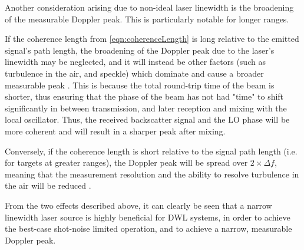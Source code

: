     Another consideration arising due to non-ideal laser linewidth is the broadening of the measurable Doppler peak. This is particularly notable for longer ranges.

    If the coherence length from \autoref{eqn:coherenceLength} is long relative to the emitted signal's path length, the broadening of the Doppler peak due to the laser's linewidth may be neglected, and it will instead be other factors (such as turbulence in the air, and speckle) which dominate and cause a broader measurable peak \cite{bennett_doppler_2003}. This is because the total round-trip time of the beam is shorter, thus ensuring that the phase of the beam has not had "time" to shift significantly in between transmission, and later reception and mixing with the local oscillator. Thus, the received backscatter signal and the LO phase will be more coherent and will result in a sharper peak after mixing.

    Conversely, if the coherence length is short relative to the signal path length (i.e. for targets at greater ranges), the Doppler peak will be spread over $2\times\Delta f$, meaning that the measurement resolution and the ability to resolve turbulence in the air will be reduced \cite{bennett_doppler_2003}.

    From the two effects described above, it can clearly be seen that a narrow linewidth laser source is highly beneficial for DWL systems, in order to achieve the best-case shot-noise limited operation, and to achieve a narrow, measurable Doppler peak.
